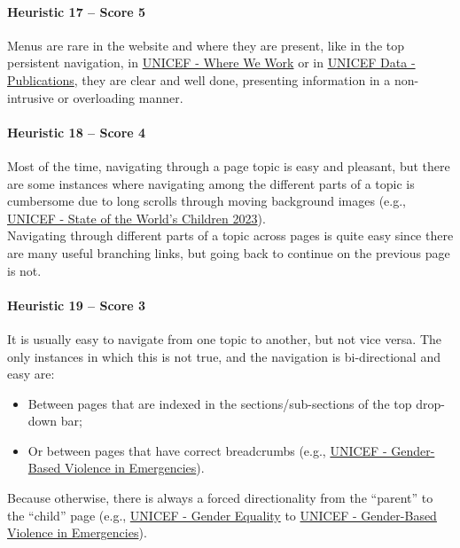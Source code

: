\paragraph*{Heuristic 17 – Score 5}
Menus are rare in the website and where they are present, like in the top persistent navigation, in \href{https://www.unicef.org/where-we-work}{UNICEF - Where We Work} or in \href{https://data.unicef.org/resources/resource-type/publications/}{UNICEF Data - Publications}, they are clear and well done, presenting information in a non-intrusive or overloading manner.

\paragraph*{Heuristic 18 – Score 4}
Most of the time, navigating through a page topic is easy and pleasant, but there are some instances where navigating among the different parts of a topic is cumbersome due to long scrolls through moving background images (e.g., \href{https://www.unicef.org/reports/state-worlds-children-2023#SOWC}{UNICEF - State of the World's Children 2023}).\\ Navigating through different parts of a topic across pages is quite easy since there are many useful branching links, but going back to continue on the previous page is not.

\paragraph*{Heuristic 19 – Score 3}
It is usually easy to navigate from one topic to another, but not vice versa. The only instances in which this is not true, and the navigation is bi-directional and easy are:
\begin{itemize}
	\item Between pages that are indexed in the sections/sub-sections of the top drop-down bar;
	\item Or between pages that have correct breadcrumbs (e.g., \href{https://www.unicef.org/protection/gender-based-violence-in-emergencies}{UNICEF - Gender-Based Violence in Emergencies}).
\end{itemize}
Because otherwise, there is always a forced directionality from the “parent” to the “child” page (e.g., \href{https://www.unicef.org/gender-equality}{UNICEF - Gender Equality} to \href{https://www.unicef.org/protection/gender-based-violence-in-emergencies}{UNICEF - Gender-Based Violence in Emergencies}).

